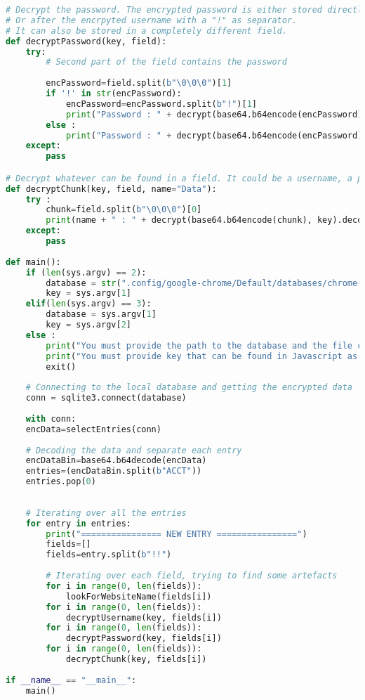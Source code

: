 \begin{lstlisting}[language=python,label=script_dec_lp, caption=Script pour déchiffrer les entrées LastPass]
# Decrypt the password. The encrypted password is either stored directly after the encrpyted username.
# Or after the encrpyted username with a "!" as separator.
# It can also be stored in a completely different field.
def decryptPassword(key, field):
	try:
		# Second part of the field contains the password
		
		encPassword=field.split(b"\0\0\0")[1]
		if '!' in str(encPassword):
			encPassword=encPassword.split(b"!")[1]
			print("Password : " + decrypt(base64.b64encode(encPassword), key).decode())
		else :
			print("Password : " + decrypt(base64.b64encode(encPassword), key).decode())
	except:
		pass

# Decrypt whatever can be found in a field. It could be a username, a password, a note, an entry name, ...
def decryptChunk(key, field, name="Data"):
	try :
		chunk=field.split(b"\0\0\0")[0]
		print(name + " : " + decrypt(base64.b64encode(chunk), key).decode())
	except:
		pass
		
def main():
	if (len(sys.argv) == 2):
		database = str(".config/google-chrome/Default/databases/chrome-extension_hdokiejnpimakedhajhdlcegeplioahd_0/9")
		key = sys.argv[1]
	elif(len(sys.argv) == 3):
		database = sys.argv[1]
		key = sys.argv[2]
	else :
		print("You must provide the path to the database and the file containing the potential keys as argument. If you provide nothing, default values will be used.")
		print("You must provide key that can be found in Javascript as g_local_key")
		exit()
	
	# Connecting to the local database and getting the encrypted data
	conn = sqlite3.connect(database)
	
	with conn:
	encData=selectEntries(conn)
	
	# Decoding the data and separate each entry
	encDataBin=base64.b64decode(encData)
	entries=(encDataBin.split(b"ACCT"))
	entries.pop(0)
	
	
	# Iterating over all the entries
	for entry in entries:
		print("================ NEW ENTRY ================")
		fields=[]
		fields=entry.split(b"!!")
		
		# Iterating over each field, trying to find some artefacts
		for i in range(0, len(fields)):
			lookForWebsiteName(fields[i])
		for i in range(0, len(fields)):
			decryptUsername(key, fields[i])
		for i in range(0, len(fields)):
			decryptPassword(key, fields[i])
		for i in range(0, len(fields)):
			decryptChunk(key, fields[i])
	
if __name__ == "__main__":
	main()
\end{lstlisting}